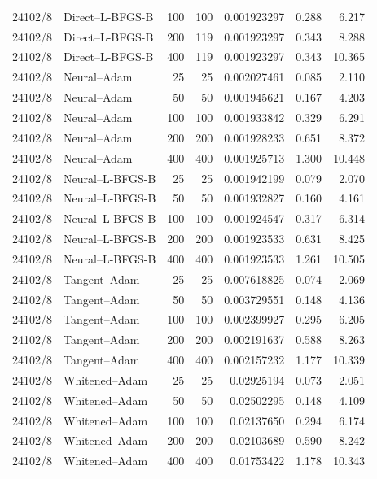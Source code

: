 \begin{longtable}{llrrrrr}
24102/8 & Direct--L-BFGS-B & 100 & 100 & 0.001923297 & 0.288 & 6.217\\
24102/8 & Direct--L-BFGS-B & 200 & 119 & 0.001923297 & 0.343 & 8.288\\
24102/8 & Direct--L-BFGS-B & 400 & 119 & 0.001923297 & 0.343 & 10.365\\
24102/8 & Neural--Adam & 25 & 25 & 0.002027461 & 0.085 & 2.110\\
24102/8 & Neural--Adam & 50 & 50 & 0.001945621 & 0.167 & 4.203\\
24102/8 & Neural--Adam & 100 & 100 & 0.001933842 & 0.329 & 6.291\\
24102/8 & Neural--Adam & 200 & 200 & 0.001928233 & 0.651 & 8.372\\
24102/8 & Neural--Adam & 400 & 400 & 0.001925713 & 1.300 & 10.448\\
24102/8 & Neural--L-BFGS-B & 25 & 25 & 0.001942199 & 0.079 & 2.070\\
24102/8 & Neural--L-BFGS-B & 50 & 50 & 0.001932827 & 0.160 & 4.161\\
24102/8 & Neural--L-BFGS-B & 100 & 100 & 0.001924547 & 0.317 & 6.314\\
24102/8 & Neural--L-BFGS-B & 200 & 200 & 0.001923533 & 0.631 & 8.425\\
24102/8 & Neural--L-BFGS-B & 400 & 400 & 0.001923533 & 1.261 & 10.505\\
24102/8 & Tangent--Adam & 25 & 25 & 0.007618825 & 0.074 & 2.069\\
24102/8 & Tangent--Adam & 50 & 50 & 0.003729551 & 0.148 & 4.136\\
24102/8 & Tangent--Adam & 100 & 100 & 0.002399927 & 0.295 & 6.205\\
24102/8 & Tangent--Adam & 200 & 200 & 0.002191637 & 0.588 & 8.263\\
24102/8 & Tangent--Adam & 400 & 400 & 0.002157232 & 1.177 & 10.339\\
24102/8 & Whitened--Adam & 25 & 25 & 0.02925194 & 0.073 & 2.051\\
24102/8 & Whitened--Adam & 50 & 50 & 0.02502295 & 0.148 & 4.109\\
24102/8 & Whitened--Adam & 100 & 100 & 0.02137650 & 0.294 & 6.174\\
24102/8 & Whitened--Adam & 200 & 200 & 0.02103689 & 0.590 & 8.242\\
24102/8 & Whitened--Adam & 400 & 400 & 0.01753422 & 1.178 & 10.343\\
\bottomrule\end{longtable}\normalsize
